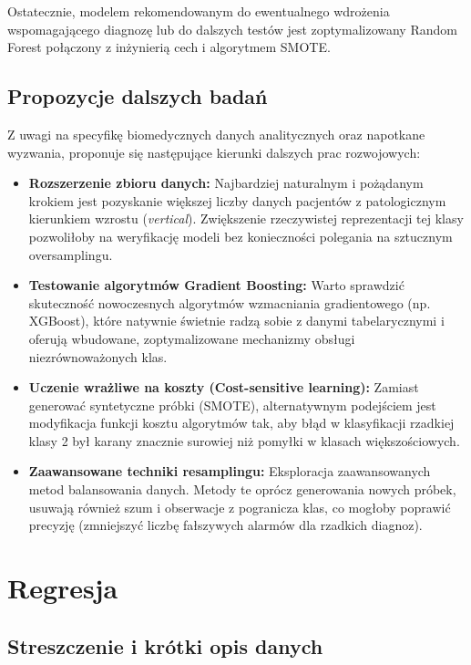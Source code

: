 \documentclass[12pt, a4paper]{article}
\begin{document}
Ostatecznie, modelem rekomendowanym do ewentualnego wdrożenia wspomagającego diagnozę lub do dalszych testów jest zoptymalizowany Random Forest połączony z inżynierią cech i algorytmem SMOTE.

\subsection{Propozycje dalszych badań}
Z uwagi na specyfikę biomedycznych danych analitycznych oraz napotkane wyzwania, proponuje się następujące kierunki dalszych prac rozwojowych:
\begin{itemize}
    \item \textbf{Rozszerzenie zbioru danych:} Najbardziej naturalnym i pożądanym krokiem jest pozyskanie większej liczby danych pacjentów z patologicznym kierunkiem wzrostu (\textit{vertical}). Zwiększenie rzeczywistej reprezentacji tej klasy pozwoliłoby na weryfikację modeli bez konieczności polegania na sztucznym oversamplingu.
    \item \textbf{Testowanie algorytmów Gradient Boosting:} Warto sprawdzić skuteczność nowoczesnych algorytmów wzmacniania gradientowego (np. XGBoost), które natywnie świetnie radzą sobie z danymi tabelarycznymi i oferują wbudowane, zoptymalizowane mechanizmy obsługi niezrównoważonych klas.
    \item \textbf{Uczenie wrażliwe na koszty (Cost-sensitive learning):} Zamiast generować syntetyczne próbki (SMOTE), alternatywnym podejściem jest modyfikacja funkcji kosztu algorytmów tak, aby błąd w klasyfikacji rzadkiej klasy 2 był karany znacznie surowiej niż pomyłki w klasach większościowych.
    \item \textbf{Zaawansowane techniki resamplingu:} Eksploracja zaawansowanych metod balansowania danych. Metody te oprócz generowania nowych próbek, usuwają również szum i obserwacje z pogranicza klas, co mogłoby poprawić precyzję (zmniejszyć liczbę fałszywych alarmów dla rzadkich diagnoz).
\end{itemize}







\section{Regresja}
\subsection{Streszczenie i krótki opis danych}
\end{document}
